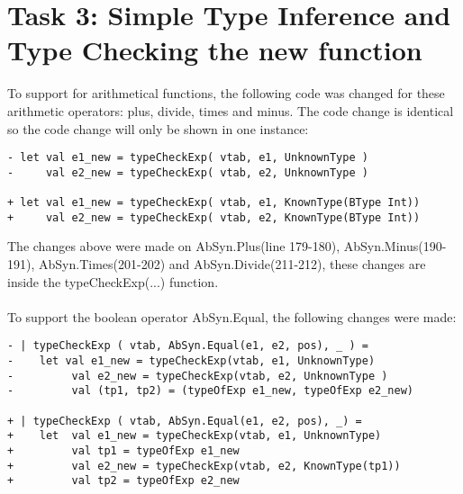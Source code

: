 \section{Task 3: Simple Type Inference and Type Checking the new function}
To support for arithmetical functions, the following code was changed for these
arithmetic operators: plus, divide, times and minus. The code change is
identical so the code change will only be shown in one instance:
\begin{lstlisting}[style=MLStyle]
- let val e1_new = typeCheckExp( vtab, e1, UnknownType )
-     val e2_new = typeCheckExp( vtab, e2, UnknownType )

+ let val e1_new = typeCheckExp( vtab, e1, KnownType(BType Int))
+     val e2_new = typeCheckExp( vtab, e2, KnownType(BType Int))
\end{lstlisting}

The changes above were made on AbSyn.Plus(line 179-180), AbSyn.Minus(190-191),
AbSyn.Times(201-202) and AbSyn.Divide(211-212), these changes are inside the
typeCheckExp(...) function.\\
\\
To support the boolean operator AbSyn.Equal, the following changes were made:
\begin{lstlisting}[style=MLStyle]
- | typeCheckExp ( vtab, AbSyn.Equal(e1, e2, pos), _ ) =
-    let val e1_new = typeCheckExp(vtab, e1, UnknownType)
-         val e2_new = typeCheckExp(vtab, e2, UnknownType )
-         val (tp1, tp2) = (typeOfExp e1_new, typeOfExp e2_new)

+ | typeCheckExp ( vtab, AbSyn.Equal(e1, e2, pos), _) =
+    let  val e1_new = typeCheckExp(vtab, e1, UnknownType)
+         val tp1 = typeOfExp e1_new
+         val e2_new = typeCheckExp(vtab, e2, KnownType(tp1))
+         val tp2 = typeOfExp e2_new 
\end{lstlisting}

